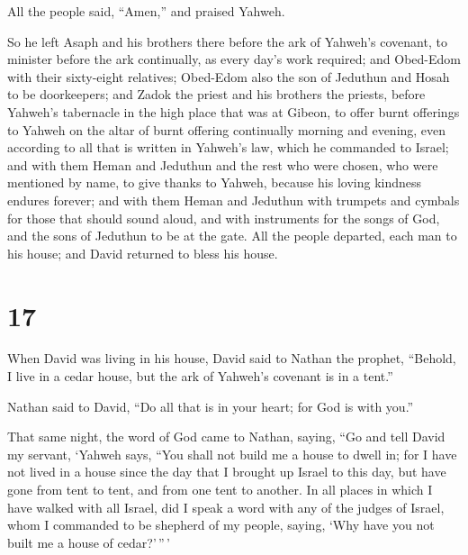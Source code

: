 All the people said, ``Amen,'' and praised Yahweh.

 So he left Asaph and his brothers there before the ark
of Yahweh's covenant, to minister before the ark continually, as every
day's work required;  and Obed-Edom with their
sixty-eight relatives; Obed-Edom also the son of Jeduthun and Hosah to
be doorkeepers;  and Zadok the priest and his brothers
the priests, before Yahweh's tabernacle in the high place that was at
Gibeon,  to offer burnt offerings to Yahweh on the altar
of burnt offering continually morning and evening, even according to all
that is written in Yahweh's law, which he commanded to Israel;
 and with them Heman and Jeduthun and the rest who were
chosen, who were mentioned by name, to give thanks to Yahweh, because
his loving kindness endures forever;  and with them Heman
and Jeduthun with trumpets and cymbals for those that should sound
aloud, and with instruments for the songs of God, and the sons of
Jeduthun to be at the gate.  All the people departed,
each man to his house; and David returned to bless his house.

\hypertarget{section-16}{%
\section{17}\label{section-16}}

 When David was living in his house, David said to Nathan
the prophet, ``Behold, I live in a cedar house, but the ark of Yahweh's
covenant is in a tent.''

 Nathan said to David, ``Do all that is in your heart; for
God is with you.''

 That same night, the word of God came to Nathan, saying,
 ``Go and tell David my servant, `Yahweh says, ``You shall
not build me a house to dwell in;  for I have not lived in
a house since the day that I brought up Israel to this day, but have
gone from tent to tent, and from one tent to another.  In
all places in which I have walked with all Israel, did I speak a word
with any of the judges of Israel, whom I commanded to be shepherd of my
people, saying, `Why have you not built me a house of cedar?'\,''\,'

